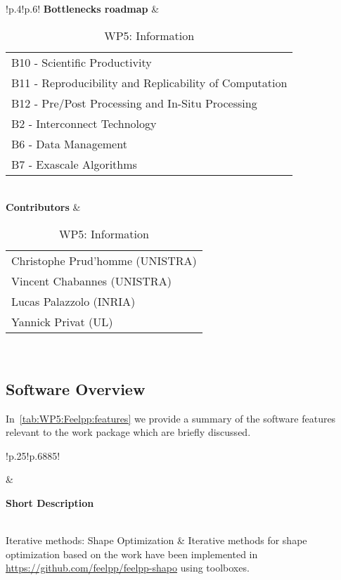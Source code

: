 \begin{table}[!ht]
{{\begin{tabular}{!{\color{numpexgray}\vrule}p{.4\textwidth}!{\color{numpexgray}\vrule}p{.6\textwidth}!{\color{numpexgray}\vrule}}
        \textbf{Bottlenecks roadmap} & \begin{tabular}{l}
B10 - Scientific Productivity\\
B11 - Reproducibility and Replicability of Computation\\
B12 - Pre/Post Processing and In-Situ Processing\\
B2 - Interconnect Technology\\
B6 - Data Management\\
B7 - Exascale Algorithms\\
\end{tabular} \\
\textbf{Contributors} & \begin{tabular}{l}
Christophe Prud'homme (UNISTRA)\\
Vincent Chabannes (UNISTRA)\\
Lucas Palazzolo (INRIA)\\
Yannick Privat (UL)
\end{tabular}\\
        \bottomrule
    \end{tabular}
    }}
    \caption{WP5: \Feelpp Information}
\end{table}

\subsection{Software Overview}
\label{sec:WP5:Feelpp:summary}

In~\cref{tab:WP5:Feelpp:features} we provide a summary of the software features relevant to the work package which are briefly discussed.

\begin{table}[!ht]
    \centering
    {
        \setlength{\parindent}{0pt}
        \def\arraystretch{1.25}
        {
            \fontsize{9}{11}\selectfont
            \begin{tabular}{!{\color{numpexgray}\vrule}p{.25\linewidth}!{\color{numpexgray}\vrule}p{.6885\linewidth}!{\color{numpexgray}\vrule}}
    
     &  {\rule{0pt}{2.5ex}\color{white}\bf Short Description }\\ 
    
    Iterative methods: Shape Optimization & Iterative methods for shape optimization based on the work \cite{feppon_f_null_2020} have been implemented in \url{https://github.com/feelpp/feelpp-shapo} using \Feelpp toolboxes.\\
\end{tabular}
        }
    }
    \caption{WP5: \Feelpp Features}
    \label{tab:WP5:Feelpp:features}
\end{table}


